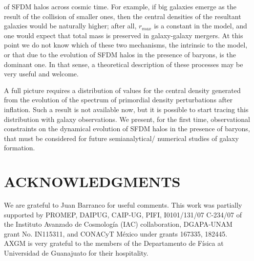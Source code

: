 \documentclass{article}
\begin{document}
\begin{multicols}{2}
of SFDM halos across cosmic time. For example, if big
galaxies emerge as the result of the collision of smaller
ones, then the central densities of the resultant galaxies
would be naturally higher; after all, $r_{max}$ is a constant
in the model, and one would expect that total mass is
preserved in galaxy-galaxy mergers. At this point we do
not know which of these two mechanisms, the intrinsic to
the model, or that due to the evolution of SFDM halos
in the presence of baryons, is the dominant one. In that
sense, a theoretical description of these processes may be
very useful and welcome.\par
A full picture requires a distribution of values for the
central density generated from the evolution of the spectrum
of primordial density perturbations after inflation. 
Such a result is not available now, but it is possible to
start tracing this distribution with galaxy observations.
We present, for the first time, observational constraints
on the dynamical evolution of SFDM halos in the presence
of baryons, that must be considered for future semianalytical/
numerical studies of galaxy formation.

\section{ACKNOWLEDGMENTS}
We are grateful to Juan Barranco for useful comments.
This work was partially supported by PROMEP, DAIPUG,
CAIP-UG, PIFI, I0101/131/07 C-234/07 of the Instituto
Avanzado de Cosmología (IAC) collaboration,
DGAPA-UNAM grant No. IN115311, and CONACyT
México under grants 167335, 182445. AXGM is very
grateful to the members of the Departamento de Física
at Universidad de Guanajuato for their hospitality.\par


\end{multicols}
\end{document}
